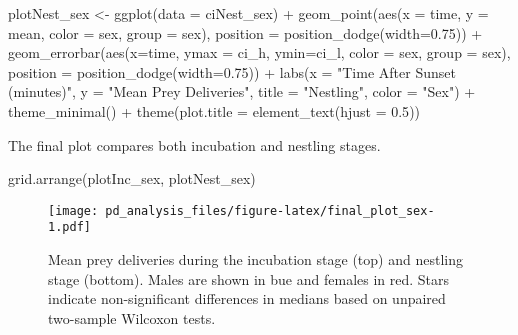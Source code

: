 \documentclass[
]{article}
\newenvironment{Shaded}{\begin{snugshade}}{\end{snugshade}}
\newcommand{\AttributeTok}[1]{\textcolor[rgb]{0.77,0.63,0.00}{#1}}
\newcommand{\FloatTok}[1]{\textcolor[rgb]{0.00,0.00,0.81}{#1}}
\newcommand{\FunctionTok}[1]{\textcolor[rgb]{0.00,0.00,0.00}{#1}}
\newcommand{\NormalTok}[1]{#1}
\newcommand{\OtherTok}[1]{\textcolor[rgb]{0.56,0.35,0.01}{#1}}
\newcommand{\SpecialCharTok}[1]{\textcolor[rgb]{0.00,0.00,0.00}{#1}}
\newcommand{\StringTok}[1]{\textcolor[rgb]{0.31,0.60,0.02}{#1}}
\begin{document}
\begin{Shaded}
\begin{Highlighting}[]
\NormalTok{plotNest\_sex }\OtherTok{\textless{}{-}} \FunctionTok{ggplot}\NormalTok{(}\AttributeTok{data =}\NormalTok{ ciNest\_sex) }\SpecialCharTok{+}
  \FunctionTok{geom\_point}\NormalTok{(}\FunctionTok{aes}\NormalTok{(}\AttributeTok{x =}\NormalTok{ time, }\AttributeTok{y =}\NormalTok{ mean, }\AttributeTok{color =}\NormalTok{ sex, }\AttributeTok{group =}\NormalTok{ sex),}
             \AttributeTok{position =} \FunctionTok{position\_dodge}\NormalTok{(}\AttributeTok{width=}\FloatTok{0.75}\NormalTok{)) }\SpecialCharTok{+}
  \FunctionTok{geom\_errorbar}\NormalTok{(}\FunctionTok{aes}\NormalTok{(}\AttributeTok{x=}\NormalTok{time, }\AttributeTok{ymax =}\NormalTok{ ci\_h, }\AttributeTok{ymin=}\NormalTok{ci\_l, }\AttributeTok{color =}\NormalTok{ sex, }
                    \AttributeTok{group =}\NormalTok{ sex),}
                \AttributeTok{position =} \FunctionTok{position\_dodge}\NormalTok{(}\AttributeTok{width=}\FloatTok{0.75}\NormalTok{)) }\SpecialCharTok{+}
  \FunctionTok{labs}\NormalTok{(}\AttributeTok{x =} \StringTok{"Time After Sunset (minutes)"}\NormalTok{, }\AttributeTok{y =} \StringTok{"Mean Prey Deliveries"}\NormalTok{, }
       \AttributeTok{title =} \StringTok{"Nestling"}\NormalTok{, }\AttributeTok{color =} \StringTok{"Sex"}\NormalTok{) }\SpecialCharTok{+}
  \FunctionTok{theme\_minimal}\NormalTok{() }\SpecialCharTok{+}
  \FunctionTok{theme}\NormalTok{(}\AttributeTok{plot.title =} \FunctionTok{element\_text}\NormalTok{(}\AttributeTok{hjust =} \FloatTok{0.5}\NormalTok{)) }
\end{Highlighting}
\end{Shaded}

The final plot compares both incubation and nestling stages.

\begin{Shaded}
\begin{Highlighting}[]
\FunctionTok{grid.arrange}\NormalTok{(plotInc\_sex, plotNest\_sex)}
\end{Highlighting}
\end{Shaded}

\begin{figure}
\centering
\texttt{[image: pd\_analysis\_files/figure-latex/final\_plot\_sex-1.pdf]}
\caption{Mean prey deliveries during the incubation stage (top) and
nestling stage (bottom). Males are shown in bue and females in red.
Stars indicate non-significant differences in medians based on unpaired
two-sample Wilcoxon tests.}
\end{figure}
\end{document}
